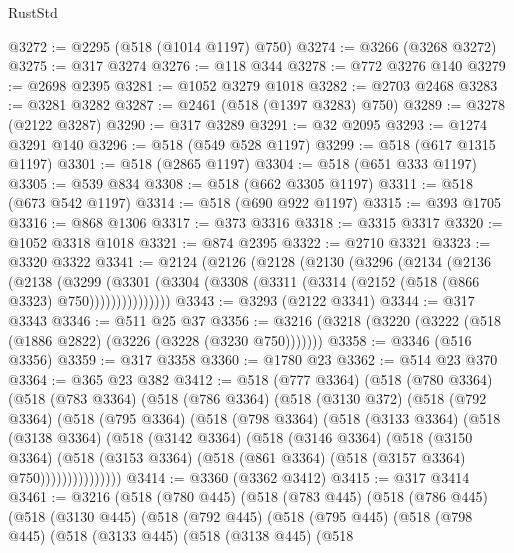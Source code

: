 \begin{lexlean}{RustStd}
\begin{coremodule}
@3272 := @2295 (@518 (@1014 @1197) @750)
@3274 := @3266 (@3268 @3272)
@3275 := @317 @3274
@3276 := @118 @344
@3278 := @772 @3276 @140
@3279 := @2698 @2395
@3281 := @1052 @3279 @1018
@3282 := @2703 @2468
@3283 := @3281 @3282
@3287 := @2461 (@518 (@1397 @3283) @750)
@3289 := @3278 (@2122 @3287)
@3290 := @317 @3289
@3291 := @32 @2095
@3293 := @1274 @3291 @140
@3296 := @518 (@549 @528 @1197)
@3299 := @518 (@617 @1315 @1197)
@3301 := @518 (@2865 @1197)
@3304 := @518 (@651 @333 @1197)
@3305 := @539 @834
@3308 := @518 (@662 @3305 @1197)
@3311 := @518 (@673 @542 @1197)
@3314 := @518 (@690 @922 @1197)
@3315 := @393 @1705
@3316 := @868 @1306
@3317 := @373 @3316
@3318 := @3315 @3317
@3320 := @1052 @3318 @1018
@3321 := @874 @2395
@3322 := @2710 @3321
@3323 := @3320 @3322
@3341 := @2124
    (@2126
      (@2128
        (@2130
          (@3296
            (@2134
              (@2136
                (@2138
                  (@3299
                    (@3301 (@3304 (@3308 (@3311 (@3314 (@2152 (@518 (@866 @3323) @750)))))))))))))))
@3343 := @3293 (@2122 @3341)
@3344 := @317 @3343
@3346 := @511 @25 @37
@3356 := @3216 (@3218 (@3220 (@3222 (@518 (@1886 @2822) (@3226 (@3228 (@3230 @750)))))))
@3358 := @3346 (@516 @3356)
@3359 := @317 @3358
@3360 := @1780 @23
@3362 := @514 @23 @370
@3364 := @365 @23 @382
@3412 := @518
    (@777 @3364)
    (@518
      (@780 @3364)
      (@518
        (@783 @3364)
        (@518
          (@786 @3364)
          (@518
            (@3130 @372)
            (@518
              (@792 @3364)
              (@518
                (@795 @3364)
                (@518
                  (@798 @3364)
                  (@518
                    (@3133 @3364)
                    (@518
                      (@3138 @3364)
                      (@518
                        (@3142 @3364)
                        (@518
                          (@3146 @3364)
                          (@518
                            (@3150 @3364)
                            (@518
                              (@3153 @3364)
                              (@518 (@861 @3364) (@518 (@3157 @3364) @750)))))))))))))))
@3414 := @3360 (@3362 @3412)
@3415 := @317 @3414
@3461 := @3216
    (@518
      (@780 @445)
      (@518
        (@783 @445)
        (@518
          (@786 @445)
          (@518
            (@3130 @445)
            (@518
              (@792 @445)
              (@518
                (@795 @445)
                (@518
                  (@798 @445)
                  (@518
                    (@3133 @445)
                    (@518
                      (@3138 @445)
                      (@518

\end{coremodule}
\end{lexlean}
